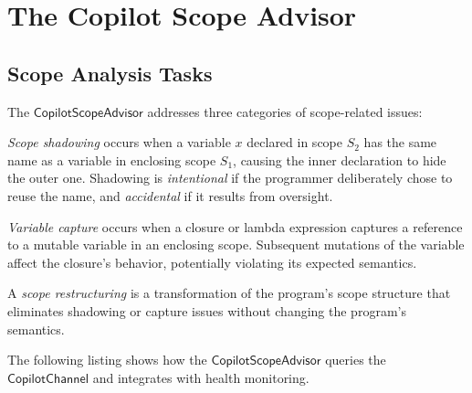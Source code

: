 \documentclass[11pt]{article}
\newcommand{\ScopeAdv}{\mathsf{CopilotScopeAdvisor}}
\newcommand{\CopChan}{\mathsf{CopilotChannel}}
\begin{document}
\section{The Copilot Scope Advisor}
\label{sec:scope}

\subsection{Scope Analysis Tasks}
\label{sec:scope:tasks}

The $\ScopeAdv$ addresses three categories of scope-related issues:

\begin{definition}
\label{def:shadowing}
\emph{Scope shadowing} occurs when a variable $x$ declared in
scope $S_2$ has the same name as a variable in enclosing scope
$S_1$, causing the inner declaration to hide the outer one.
Shadowing is \emph{intentional} if the programmer deliberately
chose to reuse the name, and \emph{accidental} if it results
from oversight.
\end{definition}

\begin{definition}
\label{def:capture}
\emph{Variable capture} occurs when a closure or lambda expression
captures a reference to a mutable variable in an enclosing scope.
Subsequent mutations of the variable affect the closure's behavior,
potentially violating its expected semantics.
\end{definition}

\begin{definition}
\label{def:restructuring}
A \emph{scope restructuring} is a transformation of the program's
scope structure that eliminates shadowing or capture issues without
changing the program's semantics.
\end{definition}

The following listing shows how the $\ScopeAdv$ queries the
$\CopChan$ and integrates with health monitoring.
\end{document}
